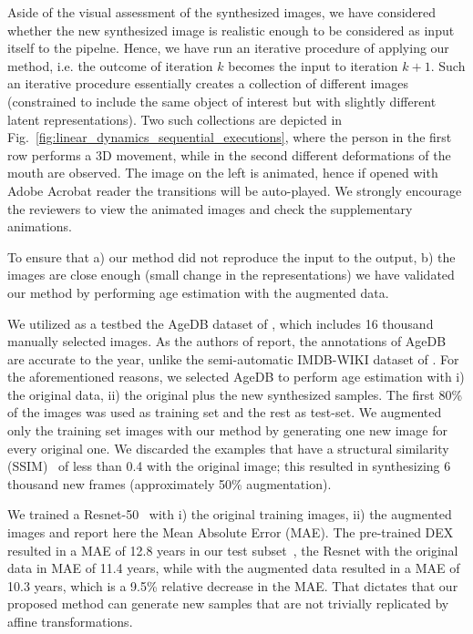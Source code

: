 \documentclass[10pt,twocolumn,letterpaper]{article}
\begin{document}
Aside of the visual assessment of the synthesized images, we have considered whether the new synthesized image is realistic enough to be considered as input itself to the pipelne. Hence, we have run an iterative procedure of applying our method, i.e. the outcome of iteration $k$ becomes the input to iteration $k + 1$. Such an iterative procedure essentially creates a collection of different images (constrained to include the same object of interest but with slightly different latent representations). Two such collections are depicted in Fig.~\ref{fig:linear_dynamics_sequential_executions}, where the person in the first row performs a 3D movement, while in the second different deformations of the mouth are observed. The image on the left is animated, hence if opened with Adobe Acrobat reader the transitions will be auto-played. We strongly encourage the reviewers to view the animated images and check the supplementary animations.

To ensure that a) our method did not reproduce the input to the output, b) the images are close enough (small change in the representations) we have validated our method by performing age estimation with the augmented data. 

We utilized as a testbed the AgeDB dataset of \cite{moschoglou2017agedb}, which includes 16 thousand manually selected images. As the authors of \cite{moschoglou2017agedb} report, the annotations of AgeDB are accurate to the year, unlike the semi-automatic IMDB-WIKI dataset of \cite{rothe2016deep}. For the aforementioned reasons, we selected AgeDB to perform age estimation with i) the original data, ii) the original plus the new synthesized samples. The first 80\% of the images was used as training set and the rest as test-set. We augmented only the training set images with our method by generating one new image for every original one. We discarded the examples that have a structural similarity (SSIM)~\cite{wang2004image} of less than 0.4 with the original image; this resulted in synthesizing 6 thousand new frames (approximately 50\% augmentation). 

We trained a Resnet-50~\cite{he2015deep}  with i) the original training images, ii) the augmented images and report here the Mean Absolute Error (MAE). The pre-trained DEX~\cite{rothe2016deep} resulted in a MAE of 12.8 years in our test subset~\cite{moschoglou2017agedb}, the Resnet with the original data in MAE of 11.4 years, while with the augmented data resulted in a MAE of 10.3 years, which is a 9.5\% relative decrease in the MAE. That dictates that our proposed method can generate new samples that are not trivially replicated by affine transformations. 
\end{document}
